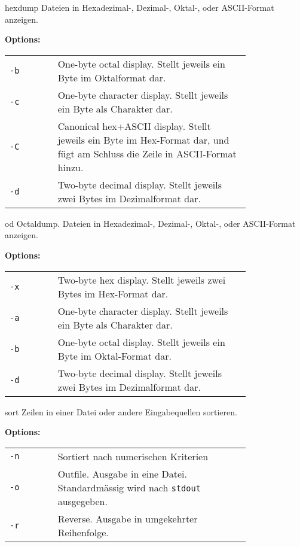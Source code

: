 \begin{flashcard}[Command]{hexdump}
	Dateien in Hexadezimal-, Dezimal-, Oktal-, oder ASCII-Format anzeigen.
	
	\textbf{Options:}
	
	\begin{tabular}{lp{0.8\linewidth}}
		\texttt{-b} & One-byte octal display. Stellt jeweils ein Byte im Oktalformat dar.\\
		\texttt{-c} & One-byte character display. Stellt jeweils ein Byte als Charakter dar.\\
		\texttt{-C} & Canonical hex+ASCII display. Stellt jeweils ein Byte im Hex-Format dar, und fügt am Schluss die Zeile in ASCII-Format hinzu.\\
		\texttt{-d} & Two-byte decimal display. Stellt jeweils zwei Bytes im Dezimalformat dar.\\
	\end{tabular}
	
	
\end{flashcard}

\begin{flashcard}[Command]{od}
	Octaldump. Dateien in Hexadezimal-, Dezimal-, Oktal-, oder ASCII-Format anzeigen.
	
	\textbf{Options:}
	
	\begin{tabular}{lp{0.8\linewidth}}
		\texttt{-x} & Two-byte hex display. Stellt jeweils zwei Bytes im Hex-Format dar.\\
		\texttt{-a} & One-byte character display. Stellt jeweils ein Byte als Charakter dar.\\
		\texttt{-b} & One-byte octal display. Stellt jeweils ein Byte im Oktal-Format dar.\\
		\texttt{-d} & Two-byte decimal display. Stellt jeweils zwei Bytes im Dezimalformat dar.\\
	\end{tabular}
\end{flashcard}

\begin{flashcard}[Command]{sort}
	Zeilen in einer Datei oder andere Eingabequellen sortieren.
	
	\textbf{Options:}
	
	\begin{tabular}{lp{0.8\linewidth}}
		\texttt{-n} & Sortiert nach numerischen Kriterien\\
		\texttt{-o} & Outfile. Ausgabe in eine Datei. Standardmässig wird nach \texttt{stdout} ausgegeben.\\
		\texttt{-r} & Reverse. Ausgabe in umgekehrter Reihenfolge.\\
	\end{tabular}
\end{flashcard}

